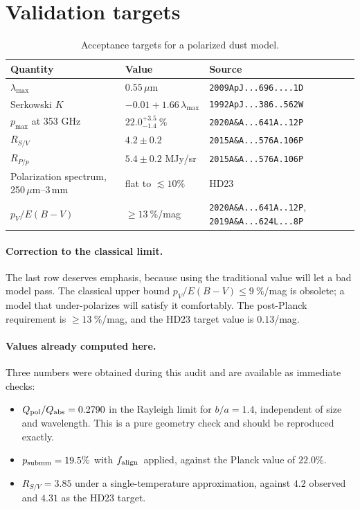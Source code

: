 \documentclass{my_memo}
\newcommand{\code}[1]{\texttt{#1}}
\newcommand{\um}{\ensuremath{\,\mu\mathrm{m}}}
\newcommand{\falign}{\ensuremath{f_{\rm align}}}
\begin{document}
\section{Validation targets}
\label{sec:validation}

\begin{table}[!ht]
\centering
\caption{Acceptance targets for a polarized dust model.}
\label{tab:validation}
\begin{tabularx}{\textwidth}{l l X}
\toprule
Quantity & Value & Source \\
\midrule
$\lambda_{\max}$ & $0.55$\um & \code{2009ApJ...696....1D} \\
Serkowski $K$ & $-0.01 + 1.66\,\lambda_{\max}$ & \code{1992ApJ...386..562W} \\
$p_{\max}$ at 353 GHz & $22.0^{+3.5}_{-1.4}\ \%$ & \code{2020A\&A...641A..12P} \\
$R_{S/V}$ & $4.2 \pm 0.2$ & \code{2015A\&A...576A.106P} \\
$R_{P/p}$ & $5.4 \pm 0.2$ MJy/sr & \code{2015A\&A...576A.106P} \\
Polarization spectrum, 250\um--3\,mm & flat to $\lesssim 10\%$ & HD23 \\
$p_V / E(B-V)$ & $\geq 13\ \%$/mag & \code{2020A\&A...641A..12P},
  \code{2019A\&A...624L...8P} \\
\bottomrule
\end{tabularx}
\end{table}

\paragraph{Correction to the classical limit.} The last row deserves
emphasis, because using the traditional value will let a bad model pass.
The classical upper bound $p_V/E(B-V) \leq 9\ \%$/mag is obsolete; a
model that under-polarizes will satisfy it comfortably. The post-Planck
requirement is $\geq 13\ \%$/mag, and the HD23 target value is
$0.13$/mag.

\paragraph{Values already computed here.} Three numbers were obtained
during this audit and are available as immediate checks:
\begin{itemize}
\item $Q_{\rm pol}/Q_{\rm abs} = 0.2790$ in the Rayleigh limit for
      $b/a = 1.4$, independent of size and wavelength. This is a pure
      geometry check and should be reproduced exactly.
\item $p_{\rm submm} = 19.5\%$ with \falign\ applied, against the Planck
      value of $22.0\%$.
\item $R_{S/V} = 3.85$ under a single-temperature approximation, against
      $4.2$ observed and $4.31$ as the HD23 target.
\end{itemize}
\end{document}

